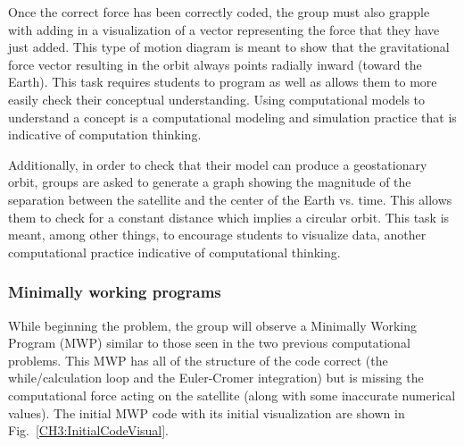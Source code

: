 \documentclass{msuphddissertation}
\begin{document}
\begin{doublespace}
Once the correct force has been correctly coded, the group must also grapple with adding in a visualization of a vector representing the force that they have just added.  This type of motion diagram is meant to show that the gravitational force vector resulting in the orbit always points radially inward (toward the Earth).  This task requires students to program as well as allows them to more easily check their conceptual understanding.  Using computational models to understand a concept is a computational modeling and simulation practice that is indicative of computation thinking.

Additionally, in order to check that their model can produce a geostationary orbit, groups are asked to generate a graph showing the magnitude of the separation between the satellite and the center of the Earth vs. time.  This allows them to check for a constant distance which implies a circular orbit.  This task is meant, among other things, to encourage students to visualize data, another computational practice indicative of computational thinking.

\subsubsection{Minimally working programs}\label{CH3:MWPs}

While beginning the problem, the group will observe a Minimally Working Program (MWP) similar to those seen in the two previous computational problems.  This MWP has all of the structure of the code correct (the while/calculation loop and the Euler-Cromer integration) but is missing the computational force acting on the satellite (along with some inaccurate numerical values).  The initial MWP code with its initial visualization are shown in Fig.~\ref{CH3:InitialCodeVisual}.


\end{doublespace}
\end{document}
